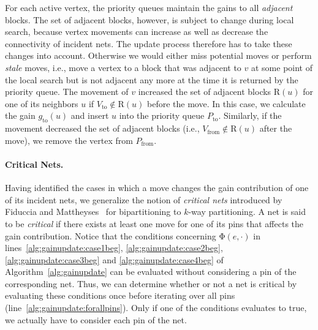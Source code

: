 \documentclass[runningheads,a4paper]{llncs}
\begin{document}
For each active vertex, the priority queues maintain the gains to all \emph{adjacent} blocks.
The set of adjacent blocks, however, is subject to change during local search, because vertex movements can increase as
well as decrease the connectivity of incident nets. The update process therefore has to take these changes into account.
Otherwise we would either miss potential moves or perform \emph{stale} moves, i.e., move a vertex to a block
that was adjacent to $v$ at some point of the local search but is not adjacent any more at the time it is returned by the priority queue.
The movement of $v$ increased the set of adjacent blocks $\mathrm{R}(u)$ for one of its neighbors $u$ if $V_{\text{to}} \not\in \mathrm{R}(u)$ before the move.
In this case, we calculate the gain $g_{\text{to}}(u)$ and insert $u$ into the priority queue $P_{\text{to}}$. Similarly, if the movement decreased the set of
adjacent blocks (i.e., $V_{\text{from}} \not\in \mathrm{R}(u)$ after the move), we remove the vertex from $P_{\text{from}}$.

\paragraph{Critical Nets.}
Having identified the cases in which a move changes the gain contribution of one of its incident nets,
we generalize the notion of \emph{critical nets} introduced by Fiduccia and Mattheyses~\cite{FM82} for bipartitioning to $k$-way partitioning. 
A net is said to be \emph{critical} if there exists at least one move for one of its pins that affects the gain contribution. 
Notice that the conditions concerning $\mathrm{\Phi}(e,\cdot)$ in lines~\ref{alg:gainupdate:case1beg}, \ref{alg:gainupdate:case2beg}, \ref{alg:gainupdate:case3beg} and \ref{alg:gainupdate:case4beg} of
Algorithm~\ref{alg:gainupdate} can be evaluated without considering a pin of the corresponding net. Thus, we can determine whether
or not a net is critical by evaluating these conditions once before iterating over all pins (line~\ref{alg:gainupdate:forallpins}). Only if one of the conditions evaluates to true, we actually have to consider each pin of the net.     
\end{document}
